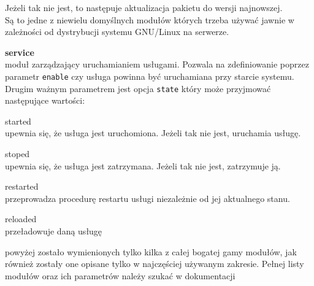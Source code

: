 \begin{description}
\begin{description}
				Jeżeli tak nie jest, to następuje aktualizacja pakietu do wersji najnowszej.\\
				Są to jedne z niewielu domyślnych modułów których trzeba używać jawnie w zależności od dystrybucji systemu GNU/Linux na serwerze.
		\end{description}
	\item{\textbf{service}}\\
		moduł zarządzający uruchamianiem usługami. Pozwala na zdefiniowanie poprzez parametr \texttt{enable} czy usługa powinna być uruchamiana przy starcie systemu.
		Drugim ważnym parametrem jest opcja \texttt{state} który może przyjmować następujące wartości:
		\begin{description}
			\item{started}\\
				upewnia się, że usługa jest uruchomiona. Jeżeli tak nie jest, uruchamia usługę.
			\item{stoped}\\
				upewnia się, że usługa jest zatrzymana. Jeżeli tak nie jest, zatrzymuje ją.
			\item{restarted}\\
				przeprowadza procedurę restartu usługi niezależnie od jej aktualnego stanu.
			\item{reloaded}\\
				przeładowuje daną usługę
		\end{description}
\end{description}
powyżej zostało wymienionych tylko kilka z całej bogatej gamy modułów, jak również zostały one opisane tylko w najczęściej używanym zakresie.
Pełnej listy modułów oraz ich parametrów należy szukać w dokumentacji
